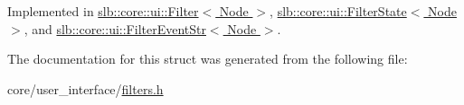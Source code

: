 Implemented in \hyperlink{structslb_1_1core_1_1ui_1_1Filter_a847ebebdfe826a3d0c26a52b13e1ba26}{slb\+::core\+::ui\+::\+Filter$<$ Node $>$}, \hyperlink{structslb_1_1core_1_1ui_1_1FilterState_abacffaaa5ed7700394e99ede2744323c}{slb\+::core\+::ui\+::\+Filter\+State$<$ Node $>$}, and \hyperlink{structslb_1_1core_1_1ui_1_1FilterEventStr_a293ba80691a7b507e8ad765e26da20a1}{slb\+::core\+::ui\+::\+Filter\+Event\+Str$<$ Node $>$}.



The documentation for this struct was generated from the following file\+:\begin{DoxyCompactItemize}
\item 
core/user\+\_\+interface/\hyperlink{filters_8h}{filters.\+h}\end{DoxyCompactItemize}
